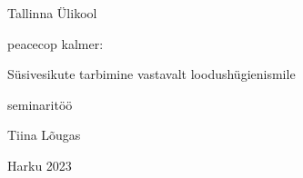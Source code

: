 \begin{titlepage}
\par{Tallinna Ülikool}
\vspace{0.3\textheight}
\par{peacecop kalmer:}
\LARGE
\par{Süsivesikute tarbimine vastavalt loodushügienismile}
\normalsize
\par{seminaritöö}
\vspace{0.3\textheight}
\begin{flushright}
\par{Tiina Lõugas}
\end{flushright}
\vfill
Harku
\hfill
2023
\end{titlepage}
